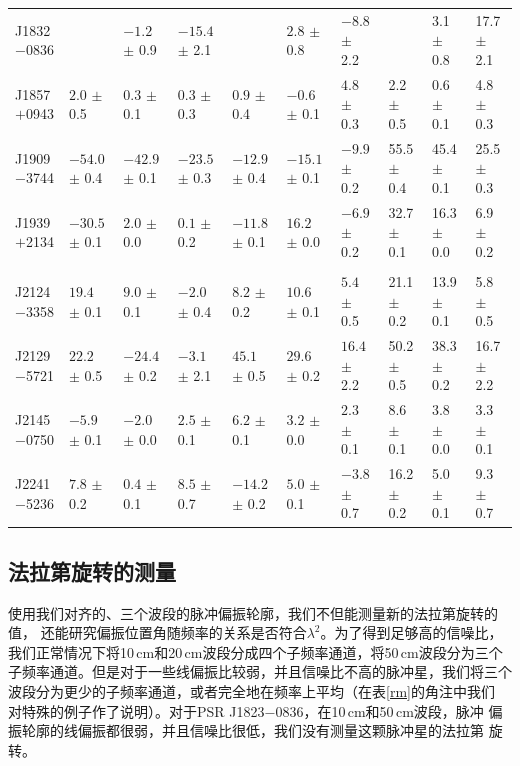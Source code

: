 \begin{landscape}
\begin{table}
\begin{center}
\begin{tabular}{p{1.9cm}p{1.88cm}p{1.88cm}p{1.88cm}p{1.88cm}p{1.88cm}p{1.88cm}p{1.8cm}p{1.8cm}p{1.8cm}}
J1832$-$0836 &                  & $-1.2 $ $\pm$ 0.9 & $-15.4$ $\pm$ 2.1 &                   & $2.8  $ $\pm$ 0.8 & $-8.8 $ $\pm$ 2.2 &                & 3.1  $\pm$ 0.8 & 17.7 $\pm$ 2.1 \\
J1857$+$0943 &$2.0  $ $\pm$ 0.5 & $0.3  $ $\pm$ 0.1 & $0.3  $ $\pm$ 0.3 & $0.9  $ $\pm$ 0.4 & $-0.6 $ $\pm$ 0.1 & $4.8  $ $\pm$ 0.3 & 2.2  $\pm$ 0.5 & 0.6  $\pm$ 0.1 & 4.8  $\pm$ 0.3 \\
J1909$-$3744 &$-54.0$ $\pm$ 0.4 & $-42.9$ $\pm$ 0.1 & $-23.5$ $\pm$ 0.3 & $-12.9$ $\pm$ 0.4 & $-15.1$ $\pm$ 0.1 & $-9.9 $ $\pm$ 0.2 & 55.5 $\pm$ 0.4 & 45.4 $\pm$ 0.1 & 25.5 $\pm$ 0.3 \\
J1939$+$2134 &$-30.5$ $\pm$ 0.1 & $2.0  $ $\pm$ 0.0 & $0.1  $ $\pm$ 0.2 & $-11.8$ $\pm$ 0.1 & $16.2 $ $\pm$ 0.0 & $-6.9 $ $\pm$ 0.2 & 32.7 $\pm$ 0.1 & 16.3 $\pm$ 0.0 & 6.9  $\pm$ 0.2 \\
             &                &                 &                &                   &                   &                   &                &                &                 \\
J2124$-$3358 &$19.4 $ $\pm$ 0.1 & $9.0  $ $\pm$ 0.1 & $-2.0 $ $\pm$ 0.4 & $8.2  $ $\pm$ 0.2 & $10.6 $ $\pm$ 0.1 & $5.4  $ $\pm$ 0.5 & 21.1 $\pm$ 0.2 & 13.9 $\pm$ 0.1 & 5.8  $\pm$ 0.5 \\
J2129$-$5721 &$22.2 $ $\pm$ 0.5 & $-24.4$ $\pm$ 0.2 & $-3.1 $ $\pm$ 2.1 & $45.1 $ $\pm$ 0.5 & $29.6 $ $\pm$ 0.2 & $16.4 $ $\pm$ 2.2 & 50.2 $\pm$ 0.5 & 38.3 $\pm$ 0.2 & 16.7 $\pm$ 2.2 \\
J2145$-$0750 &$-5.9 $ $\pm$ 0.1 & $-2.0 $ $\pm$ 0.0 & $2.5  $ $\pm$ 0.1 & $6.2  $ $\pm$ 0.1 & $3.2  $ $\pm$ 0.0 & $2.3  $ $\pm$ 0.1 & 8.6  $\pm$ 0.1 & 3.8  $\pm$ 0.0 & 3.3  $\pm$ 0.1 \\
J2241$-$5236 &$7.8  $ $\pm$ 0.2 & $0.4  $ $\pm$ 0.1 & $8.5  $ $\pm$ 0.7 & $-14.2$ $\pm$ 0.2 & $5.0  $ $\pm$ 0.1 & $-3.8 $ $\pm$ 0.7 & 16.2 $\pm$ 0.2 & 5.0  $\pm$ 0.1 & 9.3  $\pm$ 0.7 \\
\hline
\end{tabular}
\end{center}
\end{table}
\end{landscape}

\subsection{法拉第旋转的测量}

使用我们对齐的、三个波段的脉冲偏振轮廓，我们不但能测量新的法拉第旋转的值，
还能研究偏振位置角随频率的关系是否符合$\lambda^2$。为了得到足够高的信噪比，
我们正常情况下将10\,cm和20\,cm波段分成四个子频率通道，将50\,cm波段分为三个
子频率通道。但是对于一些线偏振比较弱，并且信噪比不高的脉冲星，我们将三个
波段分为更少的子频率通道，或者完全地在频率上平均（在表\ref{rm}的角注中我们
对特殊的例子作了说明）。对于PSR J1823$-$0836，在10\,cm和50\,cm波段，脉冲
偏振轮廓的线偏振都很弱，并且信噪比很低，我们没有测量这颗脉冲星的法拉第
旋转。

